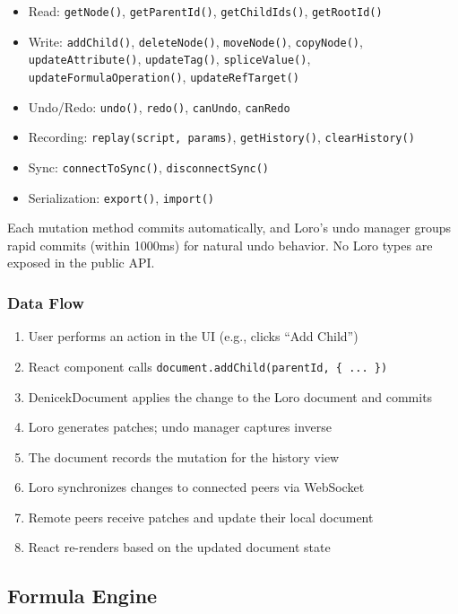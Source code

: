 \documentclass{article}
\begin{document}
\begin{itemize}
\setlength{\itemsep}{-5pt}
\item Read: \texttt{getNode()}, \texttt{getParentId()}, \texttt{getChildIds()}, \texttt{getRootId()}
\item Write: \texttt{addChild()}, \texttt{deleteNode()}, \texttt{moveNode()}, \texttt{copyNode()}, \texttt{updateAttribute()}, \texttt{updateTag()}, \texttt{spliceValue()}, \texttt{updateFormulaOperation()}, \texttt{updateRefTarget()}
\item Undo/Redo: \texttt{undo()}, \texttt{redo()}, \texttt{canUndo}, \texttt{canRedo}
\item Recording: \texttt{replay(script, params)}, \texttt{getHistory()}, \texttt{clearHistory()}
\item Sync: \texttt{connectToSync()}, \texttt{disconnectSync()}
\item Serialization: \texttt{export()}, \texttt{import()}
\end{itemize}

Each mutation method commits automatically, and Loro's undo manager groups rapid commits (within 1000ms) for natural undo behavior. No Loro types are exposed in the public API.

\subsubsection{Data Flow}

\begin{enumerate}
\item User performs an action in the UI (e.g., clicks ``Add Child'')
\item React component calls \texttt{document.addChild(parentId, \{ ... \})}
\item DenicekDocument applies the change to the Loro document and commits
\item Loro generates patches; undo manager captures inverse
\item The document records the mutation for the history view
\item Loro synchronizes changes to connected peers via WebSocket
\item Remote peers receive patches and update their local document
\item React re-renders based on the updated document state
\end{enumerate}


\subsection{Formula Engine}
\end{document}
